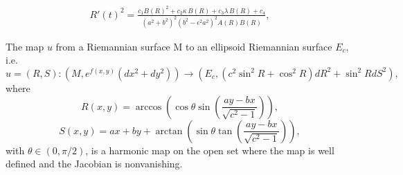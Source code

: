 \documentclass[10pt,a4paper]{amsart}
\begin{document}
\begin{align}\label{R-improved}
R'(t)^{2}
= \frac{c_{1}B(R)^{2}
       + c_{2}\kappa\, B(R)
       + c_{3}\lambda\, B(R)
       + c_{4}}
       {(a^{2}+b^{2})^{2}(b^{2}-\epsilon^{2}a^{2})^2 A(R)B(R)},
\end{align}

\begin{proposition}
		The map $u$ from a Riemannian surface M to an ellipsoid Riemannian surface $E_c$, i.e.
		\[
		u = (R,S): (M,e^{f(x,y)}(dx^2 + dy^2)) \rightarrow 
		(E_c, (c^2\sin^2R + \cos^2R)dR^2 + \sin^2R dS^2),
		\]
		where 
		\[
		R(x,y) = 
		\arccos
		\left(
		\cos\theta \sin
		\left(\frac{ay - bx}{\sqrt{c^2 - 1}}
		\right)
		\right),
		\]
		\[
		S(x,y) = 
		ax + by +
		\arctan
		\left(\sin\theta 
		\tan
		\left(\frac{ay - bx}{\sqrt{c^2 - 1}}
		\right)
		\right),
		\]
		with $\theta \in (0,\pi/2)$, is a harmonic map on the open set where the map is well defined and the Jacobian is nonvanishing.
	\end{proposition}
\end{document}

